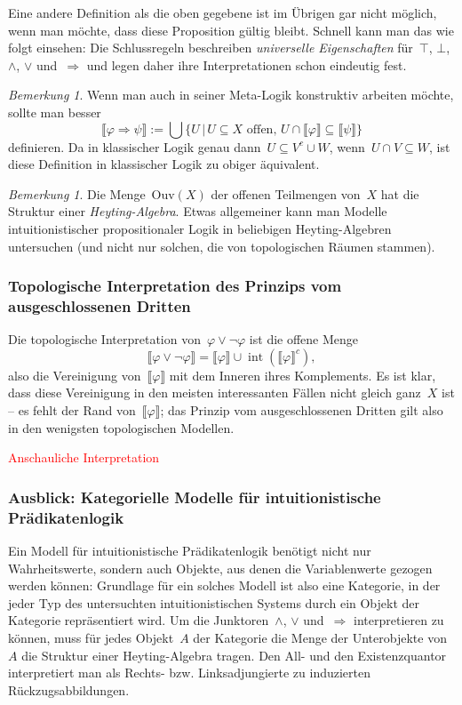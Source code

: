 \documentclass[a4paper,ngerman,12pt]{scrartcl}
\theoremstyle{definition}
\theoremstyle{plain}
\theoremstyle{remark}
\newtheorem{bem}[defn]{Bemerkung}
\newcommand{\brak}[1]{\llbracket {#1} \rrbracket}
\newcommand{\Ouv}{\mathrm{Ouv}}
\DeclareMathOperator{\interior}{int}
\renewcommand{\_}{\mathpunct{.}\,}
\newcommand{\?}{\,{:}\,}
\newcommand{\XXX}[1]{\textcolor{red}{#1}}
\begin{document}
Eine andere Definition als die oben gegebene ist im Übrigen gar nicht möglich,
wenn man möchte, dass diese Proposition gültig bleibt. Schnell kann man das wie
folgt einsehen: Die Schlussregeln beschreiben \emph{universelle Eigenschaften}
für~$\top$, $\bot$, $\wedge$, $\vee$ und~$\Rightarrow$ und legen daher ihre
Interpretationen schon eindeutig fest.

\begin{bem}Wenn man auch in seiner Meta-Logik konstruktiv arbeiten möchte,
sollte man besser
\[ \brak{\varphi \Rightarrow \psi} :=
  \bigcup \{ U \,|\, \text{$U \subseteq X$ offen, $U \cap \brak{\varphi}
  \subseteq \brak{\psi}$} \} \]
definieren. Da in klassischer Logik genau dann~$U \subseteq V^c \cup W$,
wenn~$U \cap V \subseteq W$, ist diese Definition in klassischer Logik zu
obiger äquivalent.\end{bem}

\begin{bem}Die Menge~$\Ouv(X)$ der offenen Teilmengen von~$X$ hat die Struktur
einer \emph{Heyting-Algebra}. Etwas allgemeiner kann man Modelle
intuitionistischer propositionaler Logik in beliebigen Heyting-Algebren
untersuchen (und nicht nur solchen, die von topologischen Räumen
stammen).\end{bem}


\subsubsection*{Topologische Interpretation des Prinzips vom ausgeschlossenen
Dritten}

Die topologische Interpretation von~$\varphi \vee \neg\varphi$ ist die offene
Menge
\[ \brak{\varphi \vee \neg\varphi} = \brak{\varphi} \cup \interior
(\brak{\varphi}^c), \]
also die Vereinigung von~$\brak{\varphi}$ mit dem Inneren ihres Komplements. Es
ist klar, dass diese Vereinigung in den meisten interessanten Fällen nicht
gleich ganz~$X$ ist -- es fehlt der Rand von~$\brak{\varphi}$; das Prinzip vom
ausgeschlossenen Dritten gilt also in den
wenigsten topologischen Modellen.

\XXX{Anschauliche Interpretation}


\subsubsection*{Ausblick: Kategorielle Modelle für intuitionistische Prädikatenlogik}

Ein Modell für intuitionistische Prädikatenlogik benötigt nicht nur
Wahrheitswerte, sondern auch Objekte, aus denen die Variablenwerte gezogen
werden können: Grundlage für ein solches Modell ist also eine Kategorie, in der
jeder Typ des untersuchten intuitionistischen Systems durch ein Objekt der
Kategorie repräsentiert wird. Um die Junktoren~$\wedge$, $\vee$
und~$\Rightarrow$ interpretieren zu können, muss für jedes Objekt~$A$ der
Kategorie die Menge der Unterobjekte von~$A$ die Struktur einer Heyting-Algebra
tragen. Den All- und den Existenzquantor interpretiert man als Rechts-
bzw. Linksadjungierte zu induzierten Rückzugsabbildungen.
\end{document}
